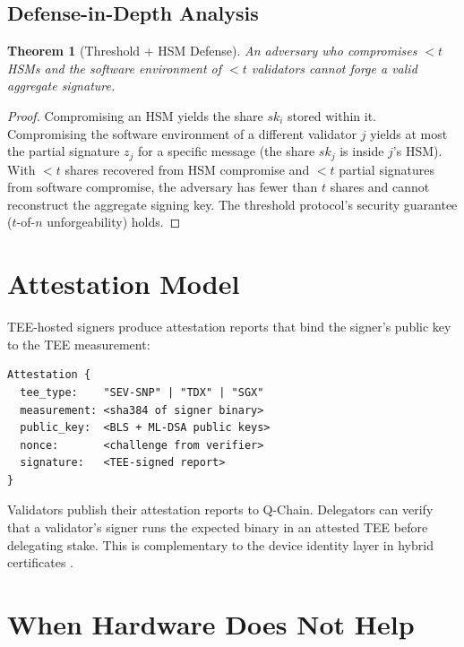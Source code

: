 \documentclass[11pt]{article}
\newtheorem{theorem}{Theorem}
\begin{document}
\subsection{Defense-in-Depth Analysis}

\begin{theorem}[Threshold + HSM Defense]
An adversary who compromises $< t$ HSMs and the software environment of $< t$ validators cannot forge a valid aggregate signature.
\end{theorem}

\begin{proof}
Compromising an HSM yields the share $sk_i$ stored within it. Compromising the software environment of a different validator $j$ yields at most the partial signature $z_j$ for a specific message (the share $sk_j$ is inside $j$'s HSM). With $< t$ shares recovered from HSM compromise and $< t$ partial signatures from software compromise, the adversary has fewer than $t$ shares and cannot reconstruct the aggregate signing key. The threshold protocol's security guarantee ($t$-of-$n$ unforgeability) holds.
\end{proof}

\section{Attestation Model}

TEE-hosted signers produce attestation reports that bind the signer's public key to the TEE measurement:

\begin{verbatim}
Attestation {
  tee_type:    "SEV-SNP" | "TDX" | "SGX"
  measurement: <sha384 of signer binary>
  public_key:  <BLS + ML-DSA public keys>
  nonce:       <challenge from verifier>
  signature:   <TEE-signed report>
}
\end{verbatim}

Validators publish their attestation reports to Q-Chain. Delegators can verify that a validator's signer runs the expected binary in an attested TEE before delegating stake. This is complementary to the device identity layer in hybrid certificates \cite{hybrid-certs}.

\section{When Hardware Does Not Help}
\end{document}
